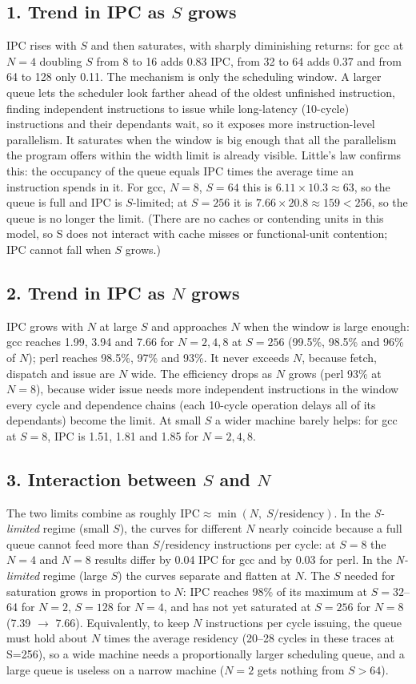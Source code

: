 \documentclass[11pt]{article}
\begin{document}
\subsection*{1. Trend in IPC as $S$ grows}
IPC rises with $S$ and then saturates, with sharply diminishing returns: for gcc at $N=4$ doubling $S$ from 8 to 16 adds 0.83 IPC, from 32 to 64 adds 0.37 and from 64 to 128 only 0.11. The mechanism is only the scheduling window. A larger queue lets the scheduler look farther ahead of the oldest unfinished instruction, finding independent instructions to issue while long-latency (10-cycle) instructions and their dependants wait, so it exposes more instruction-level parallelism. It saturates when the window is big enough that all the parallelism the program offers within the width limit is already visible. Little's law confirms this: the occupancy of the queue equals IPC times the average time an instruction spends in it. For gcc, $N=8$, $S=64$ this is $6.11\times10.3\approx 63$, so the queue is full and IPC is $S$-limited; at $S=256$ it is $7.66\times20.8\approx159<256$, so the queue is no longer the limit. (There are no caches or contending units in this model, so S does not interact with cache misses or functional-unit contention; IPC cannot fall when $S$ grows.)

\subsection*{2. Trend in IPC as $N$ grows}
IPC grows with $N$ at large $S$ and approaches $N$ when the window is large enough: gcc reaches 1.99, 3.94 and 7.66 for $N=2,4,8$ at $S=256$ (99.5\%, 98.5\% and 96\% of $N$); perl reaches 98.5\%, 97\% and 93\%. It never exceeds $N$, because fetch, dispatch and issue are $N$ wide. The efficiency drops as $N$ grows (perl 93\% at $N=8$), because wider issue needs more independent instructions in the window every cycle and dependence chains (each 10-cycle operation delays all of its dependants) become the limit. At small $S$ a wider machine barely helps: for gcc at $S=8$, IPC is 1.51, 1.81 and 1.85 for $N=2,4,8$.

\subsection*{3. Interaction between $S$ and $N$}
The two limits combine as roughly $\mathrm{IPC}\approx\min(N,\;S/\text{residency})$. In the \emph{S-limited} regime (small $S$), the curves for different $N$ nearly coincide because a full queue cannot feed more than $S/\text{residency}$ instructions per cycle: at $S=8$ the $N=4$ and $N=8$ results differ by 0.04 IPC for gcc and by 0.03 for perl. In the \emph{N-limited} regime (large $S$) the curves separate and flatten at $N$. The $S$ needed for saturation grows in proportion to $N$: IPC reaches 98\% of its maximum at $S=32$--64 for $N=2$, $S=128$ for $N=4$, and has not yet saturated at $S=256$ for $N=8$ (7.39 $\to$ 7.66). Equivalently, to keep $N$ instructions per cycle issuing, the queue must hold about $N$ times the average residency (20--28 cycles in these traces at S=256), so a wide machine needs a proportionally larger scheduling queue, and a large queue is useless on a narrow machine ($N=2$ gets nothing from $S>64$).
\end{document}
